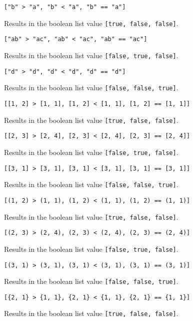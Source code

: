 {\begin{itemize}
{		\item[] \texttt{["b" > "a", "b" < "a", "b" == "a"]}
		
			Results in the boolean list value \texttt{[true, false, false]}.
			
		\item[] \texttt{["ab" > "ac", "ab" < "ac", "ab" == "ac"]}
		
			Results in the boolean list value \texttt{[false, true, false]}.
			
		\item[] \texttt{["d" > "d", "d" < "d", "d" == "d"]}
		
			Results in the boolean list value \texttt{[false, false, true]}.
			
		\item[] \texttt{[[1, 2] > [1, 1], [1, 2] < [1, 1], [1, 2] == [1, 1]]}
		
			Results in the boolean list value \texttt{[true, false, false]}.
			
		\item[] \texttt{[[2, 3] > [2, 4], [2, 3] < [2, 4], [2, 3] == [2, 4]]}
		
			Results in the boolean list value \texttt{[false, true, false]}.
			
		\item[] \texttt{[[3, 1] > [3, 1], [3, 1] < [3, 1], [3, 1] == [3, 1]]}
		
			Results in the boolean list value \texttt{[false, false, true]}.
			
		\item[] \texttt{[(1, 2) > (1, 1), (1, 2) < (1, 1), (1, 2) == (1, 1)]}
		
			Results in the boolean list value \texttt{[true, false, false]}.
			
		\item[] \texttt{[(2, 3) > (2, 4), (2, 3) < (2, 4), (2, 3) == (2, 4)]}
		
			Results in the boolean list value \texttt{[false, true, false]}.
			
		\item[] \texttt{[(3, 1) > (3, 1), (3, 1) < (3, 1), (3, 1) == (3, 1)]}
		
			Results in the boolean list value \texttt{[false, false, true]}.
			
		\item[] \texttt{[\{2, 1\} > \{1, 1\}, \{2, 1\} < \{1, 1\}, \{2, 1\} == \{1, 1\}]}
		
			Results in the boolean list value \texttt{[true, false, false]}.
			
}
\end{itemize}}
